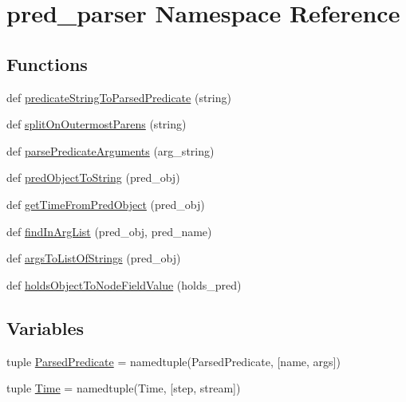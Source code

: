 \hypertarget{namespacepred__parser}{}\section{pred\+\_\+parser Namespace Reference}
\label{namespacepred__parser}
\subsection*{Functions}
\begin{DoxyCompactItemize}
\item 
def \hyperlink{namespacepred__parser_aafbae146acf181131bb122c749d70997}{predicate\+String\+To\+Parsed\+Predicate} (string)
\item 
def \hyperlink{namespacepred__parser_af74de27d3d3628a01e182ff0082cb502}{split\+On\+Outermost\+Parens} (string)
\item 
def \hyperlink{namespacepred__parser_a7e9dce7771bb530467ef4a68d11c7804}{parse\+Predicate\+Arguments} (arg\+\_\+string)
\item 
def \hyperlink{namespacepred__parser_a8af17d45b99ad2593a1063c36162187a}{pred\+Object\+To\+String} (pred\+\_\+obj)
\item 
def \hyperlink{namespacepred__parser_a29597ce97183f1be99e6a96d16d767db}{get\+Time\+From\+Pred\+Object} (pred\+\_\+obj)
\item 
def \hyperlink{namespacepred__parser_a918636a789322106c44f3ab3a40c4eb3}{find\+In\+Arg\+List} (pred\+\_\+obj, pred\+\_\+name)
\item 
def \hyperlink{namespacepred__parser_a97b4149316ed6221e074bffd1d58e43c}{args\+To\+List\+Of\+Strings} (pred\+\_\+obj)
\item 
def \hyperlink{namespacepred__parser_a2a6fff2c8801ac4b209b04d97653a9d8}{holds\+Object\+To\+Node\+Field\+Value} (holds\+\_\+pred)
\end{DoxyCompactItemize}
\subsection*{Variables}
\begin{DoxyCompactItemize}
\item 
tuple \hyperlink{namespacepred__parser_a3aacf710ab8840533bfdcc8f4e578421}{Parsed\+Predicate} = namedtuple(\textquotesingle{}Parsed\+Predicate\textquotesingle{}, \mbox{[}\textquotesingle{}name\textquotesingle{}, \textquotesingle{}args\textquotesingle{}\mbox{]})
\item 
tuple \hyperlink{namespacepred__parser_af458c74fe479675c5d30a1dbd7375bed}{Time} = namedtuple(\textquotesingle{}Time\textquotesingle{}, \mbox{[}\textquotesingle{}step\textquotesingle{}, \textquotesingle{}stream\textquotesingle{}\mbox{]})
\end{DoxyCompactItemize}



